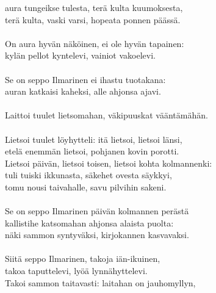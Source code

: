aura tungeikse tulesta, terä kulta kuumoksesta,                   \\
terä kulta, vaski varsi, hopeata ponnen päässä.                   \\
                                                                  \\
On aura hyvän näköinen, ei ole hyvän tapainen:                    \\
kylän pellot kyntelevi, vainiot vakoelevi.                        \\
                                                                  \\
Se on seppo Ilmarinen ei ihastu tuotakana:                        \\
auran katkaisi kaheksi, alle ahjonsa ajavi.                       \\
                                                                  \\
Laittoi tuulet lietsomahan, väkipuuskat vääntämähän.              \\
                                                                  \\
Lietsoi tuulet löyhytteli: itä lietsoi, lietsoi länsi,            \\
etelä enemmän lietsoi, pohjanen kovin porotti.                    \\
Lietsoi päivän, lietsoi toisen, lietsoi kohta kolmannenki:        \\
tuli tuiski ikkunasta, säkehet ovesta säykkyi,                    \\
tomu nousi taivahalle, savu pilvihin sakeni.                      \\
                                                                  \\
Se on seppo Ilmarinen päivän kolmannen perästä                    \\
kallistihe katsomahan ahjonsa alaista puolta:                     \\
näki sammon syntyväksi, kirjokannen kasvavaksi.                   \\
                                                                  \\
Siitä seppo Ilmarinen, takoja iän-ikuinen,                        \\
takoa taputtelevi, lyöä lynnähyttelevi.                           \\
Takoi sammon taitavasti: laitahan on jauhomyllyn,                 \\

